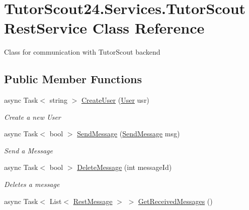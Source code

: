 \hypertarget{class_tutor_scout24_1_1_services_1_1_tutor_scout_rest_service}{}\section{Tutor\+Scout24.\+Services.\+Tutor\+Scout\+Rest\+Service Class Reference}
\label{class_tutor_scout24_1_1_services_1_1_tutor_scout_rest_service}


Class for communication with Tutor\+Scout backend  


\subsection*{Public Member Functions}
\begin{DoxyCompactItemize}
\item 
async Task$<$ string $>$ \mbox{\hyperlink{class_tutor_scout24_1_1_services_1_1_tutor_scout_rest_service_ac044899ad494ff54cd90ad36f038b993}{Create\+User}} (\mbox{\hyperlink{class_tutor_scout24_1_1_models_1_1_user_data_1_1_user}{User}} usr)
\begin{DoxyCompactList}\small\item\em Create a new User \end{DoxyCompactList}\item 
async Task$<$ bool $>$ \mbox{\hyperlink{class_tutor_scout24_1_1_services_1_1_tutor_scout_rest_service_aaccc0997a181be6e1076fc74b433ab80}{Send\+Message}} (\mbox{\hyperlink{class_tutor_scout24_1_1_models_1_1_chat_1_1_send_message}{Send\+Message}} msg)
\begin{DoxyCompactList}\small\item\em Send a Message \end{DoxyCompactList}\item 
async Task$<$ bool $>$ \mbox{\hyperlink{class_tutor_scout24_1_1_services_1_1_tutor_scout_rest_service_ae48165852bad47c2a312a392e413e846}{Delete\+Message}} (int message\+Id)
\begin{DoxyCompactList}\small\item\em Deletes a message \end{DoxyCompactList}\item 
async Task$<$ List$<$ \mbox{\hyperlink{class_tutor_scout24_1_1_models_1_1_chat_1_1_rest_message}{Rest\+Message}} $>$ $>$ \mbox{\hyperlink{class_tutor_scout24_1_1_services_1_1_tutor_scout_rest_service_a57ffeca07f199af8f3c5ca8bf8a34b35}{Get\+Received\+Messages}} ()

\end{DoxyCompactItemize}
